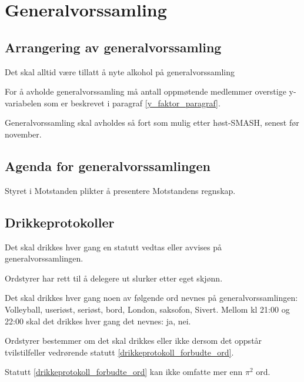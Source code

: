   
\section{Generalvorssamling}
    \subsection{Arrangering av generalvorssamling}
        \begin{statute}
            Det skal alltid være tillatt å nyte alkohol på generalvorssamling
        \end{statute}
        \begin{statute} 
            For å avholde generalvorssamling må antall oppmøtende medlemmer overstige y-variabelen som er beskrevet i paragraf \ref{y_faktor_paragraf}.
        \end{statute}
        \begin{statute}
            Generalvorssamling skal avholdes så fort som mulig etter høst-SMASH, senest før november.
        \end{statute}
    
    \subsection{Agenda for generalvorssamlingen}
        \begin{statute}
            Styret i Motstanden plikter å presentere Motstandens regnskap. 
        \end{statute}

    \subsection{Drikkeprotokoller}
        \begin{statute}
            Det skal drikkes hver gang en statutt vedtas eller avvises på generalvorssamlingen.
        \end{statute}
        \begin{statute}
            Ordstyrer har rett til å delegere ut slurker etter eget skjønn.
        \end{statute}
        \begin{statute}[\label{drikkeprotokoll_forbudte_ord}]
            Det skal drikkes hver gang noen av følgende ord nevnes på generalvorssamlingen: Volleyball, useriøst, seriøst, bord, London, saksofon, Sivert. Mellom kl 21:00 og 22:00 skal det drikkes hver gang det nevnes: ja, nei.
        \end{statute}
        \begin{statute}
            Ordstyrer bestemmer om det skal drikkes eller ikke dersom det oppstår tvilstilfeller vedrørende statutt \ref{drikkeprotokoll_forbudte_ord}.
        \end{statute}
        \begin{statute}
            Statutt \ref{drikkeprotokoll_forbudte_ord} kan ikke omfatte mer enn $\pi^2$ ord.
        \end{statute}
        
